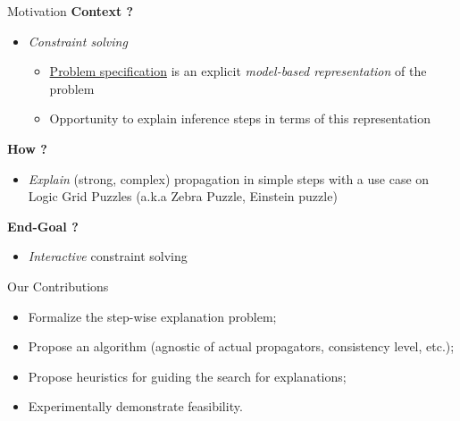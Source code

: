 \documentclass{beamer}
\begin{document}
\begin{frame}{Motivation}
    \vfill
    \textbf{Context ?}
    \begin{itemize}
        \item \textit{Constraint solving}
              \begin{itemize}
                  \item \underline{Problem specification} is an explicit \emph{model-based representation} of the problem
                  \item Opportunity to explain inference steps in terms of this representation
              \end{itemize}
    \end{itemize}\pause
    \vfill
    \textbf{How ?}
    \begin{itemize}
        \item \emph{Explain} (strong, complex) propagation in simple steps with a use case on Logic Grid Puzzles (a.k.a Zebra Puzzle, Einstein puzzle)\pause
    \end{itemize}
    \vfill
    \textbf{End-Goal ?}
    \begin{itemize}
        \item \emph{Interactive} constraint solving
    \end{itemize}

    \vfill

\end{frame}



\begin{frame}{Our Contributions}

    \begin{itemize}
        \item Formalize the step-wise explanation problem;
        \item Propose an algorithm (agnostic of actual propagators, consistency level, etc.);
        \item Propose heuristics for guiding the search for explanations;
        \item Experimentally demonstrate feasibility.
    \end{itemize}
\end{frame}
\end{document}
